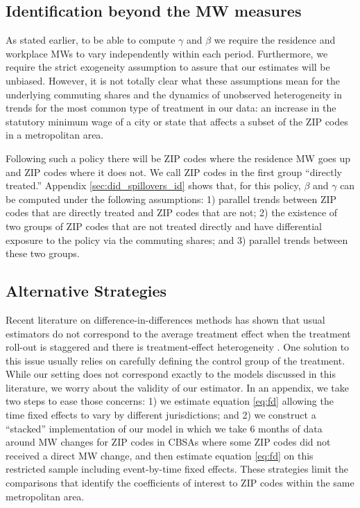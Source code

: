 \subsection{Identification beyond the MW measures}

As stated earlier, to be able to compute $\gamma$ and $\beta$ we require the 
residence and workplace MWs to vary independently within each period.
Furthermore, we require the strict exogeneity assumption to assure that our
estimates will be unbiased.
However, it is not totally clear what these assumptions mean for the underlying 
commuting shares and the dynamics of unobserved heterogeneity in trends for the 
most common type of treatment in our data: 
an increase in the statutory minimum wage of a city or state that affects 
a subset of the ZIP codes in a metropolitan area.

Following such a policy there will be ZIP codes where the residence MW goes up
and ZIP codes where it does not.
We call ZIP codes in the first group ``directly treated.''
Appendix \ref{sec:did_spillovers_id} shows that, for this policy, 
$\beta$ and $\gamma$ can be computed under the following assumptions: 
1) parallel trends between ZIP codes that are directly treated and ZIP codes 
that are not;
2) the existence of two groups of ZIP codes that are not treated directly and
have differential exposure to the policy via the commuting shares; and 
3) parallel trends between these two groups.

\subsection{Alternative Strategies}\label{sec:alt_emp_strategies}

Recent literature on difference-in-differences methods has shown that usual
estimators do not correspond to the average treatment effect when the treatment 
roll-out is staggered and there is treatment-effect heterogeneity 
\parencite{deChaisemartinEtAl2022,RothEtAl2022}.
One solution to this issue usually relies on carefully defining the control
group of the treatment.
While our setting does not correspond exactly to the models discussed in this
literature, we worry about the validity of our estimator.
In an appendix, we take two steps to ease those concerns:
1) we estimate equation \eqref{eq:fd} allowing the time fixed effects to vary
by different jurisdictions; and
2) we construct a ``stacked'' implementation of our model in which we take
6 months of data around MW changes for ZIP codes in CBSAs where some ZIP codes 
did not received a direct MW change, and then estimate equation \eqref{eq:fd} on
this restricted sample including event-by-time fixed effects.
These strategies limit the comparisons that identify the coefficients of 
interest to ZIP codes within the same metropolitan area.

